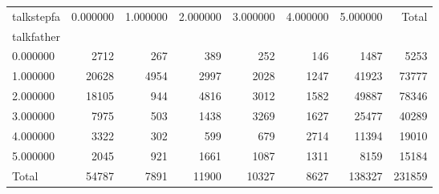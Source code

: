 \begin{tabular}{lrrrrrrr}
\toprule
talkstepfa & 0.000000 & 1.000000 & 2.000000 & 3.000000 & 4.000000 & 5.000000 & Total \\
talkfather &  &  &  &  &  &  &  \\
\midrule
0.000000 & 2712 & 267 & 389 & 252 & 146 & 1487 & 5253 \\
1.000000 & 20628 & 4954 & 2997 & 2028 & 1247 & 41923 & 73777 \\
2.000000 & 18105 & 944 & 4816 & 3012 & 1582 & 49887 & 78346 \\
3.000000 & 7975 & 503 & 1438 & 3269 & 1627 & 25477 & 40289 \\
4.000000 & 3322 & 302 & 599 & 679 & 2714 & 11394 & 19010 \\
5.000000 & 2045 & 921 & 1661 & 1087 & 1311 & 8159 & 15184 \\
Total & 54787 & 7891 & 11900 & 10327 & 8627 & 138327 & 231859 \\
\bottomrule
\end{tabular}
